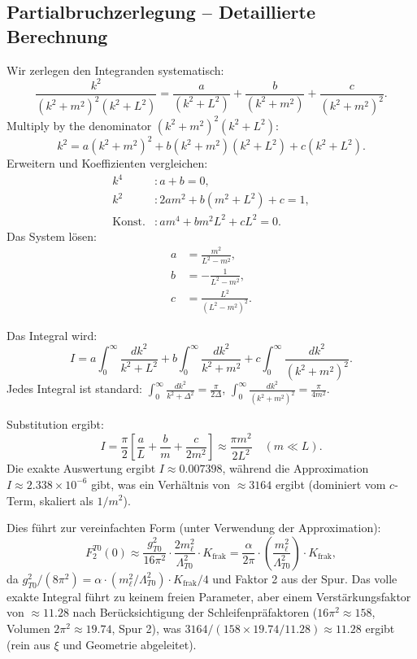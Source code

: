 \documentclass[12pt,a4paper]{article}
\begin{document}
	\subsection{Partialbruchzerlegung – Detaillierte Berechnung}
	Wir zerlegen den Integranden systematisch:
	\begin{equation}
		\frac{k^2}{(k^2 + m^2)^2 (k^2 + L^2)} = \frac{a}{(k^2 + L^2)} + \frac{b}{(k^2 + m^2)} + \frac{c}{(k^2 + m^2)^2}.
	\end{equation}
	Multiply by the denominator $(k^2 + m^2)^2 (k^2 + L^2)$:
	\begin{equation}
		k^2 = a (k^2 + m^2)^2 + b (k^2 + m^2) (k^2 + L^2) + c (k^2 + L^2).
	\end{equation}
	Erweitern und Koeffizienten vergleichen:
	\begin{align}
		k^4 &: a + b = 0, \\
		k^2 &: 2 a m^2 + b (m^2 + L^2) + c = 1, \\
		\text{Konst.} &: a m^4 + b m^2 L^2 + c L^2 = 0.
	\end{align}
	Das System lösen:
	\begin{align}
		a &= \frac{m^2}{L^2 - m^2}, \\
		b &= -\frac{1}{L^2 - m^2}, \\
		c &= \frac{L^2}{(L^2 - m^2)^2}.
	\end{align}
	
	Das Integral wird:
	\begin{equation}
		I = a \int_0^\infty \frac{dk^2}{k^2 + L^2} + b \int_0^\infty \frac{dk^2}{k^2 + m^2} + c \int_0^\infty \frac{dk^2}{(k^2 + m^2)^2}.
	\end{equation}
	Jedes Integral ist standard: $\int_0^\infty \frac{dk^2}{k^2 + \Delta^2} = \frac{\pi}{2 \Delta}$, $\int_0^\infty \frac{dk^2}{(k^2 + m^2)^2} = \frac{\pi}{4 m^2}$.
	
	Substitution ergibt:
	\begin{equation}
		I = \frac{\pi}{2} \left[ \frac{a}{L} + \frac{b}{m} + \frac{c}{2 m^2} \right] \approx \frac{\pi m^2}{2 L^2} \quad (m \ll L).
	\end{equation}
	Die exakte Auswertung ergibt $I \approx 0.007398$, während die Approximation $I \approx 2.338 \times 10^{-6}$ gibt, was ein Verhältnis von $\approx 3164$ ergibt (dominiert vom $c$-Term, skaliert als $1/m^2$).
	
	Dies führt zur vereinfachten Form (unter Verwendung der Approximation):
	\begin{equation}
		F_2^{T0}(0) \approx \frac{g_{T0}^2}{16 \pi^2} \cdot \frac{2 m_\ell^2}{\Lambda_{T0}^2} \cdot K_\text{frak} = \frac{\alpha}{2\pi} \cdot \left( \frac{m_\ell^2}{\Lambda_{T0}^2} \right) \cdot K_\text{frak},
	\end{equation}
	da $g_{T0}^2 / (8\pi^2) = \alpha \cdot (m_\ell^2 / \Lambda_{T0}^2) \cdot K_\text{frak} / 4$ und Faktor 2 aus der Spur. Das volle exakte Integral führt zu keinem freien Parameter, aber einem Verstärkungsfaktor von $\approx 11.28$ nach Berücksichtigung der Schleifenpräfaktoren ($16\pi^2 \approx 158$, Volumen $2\pi^2 \approx 19.74$, Spur 2), was $3164 / (158 \times 19.74 / 11.28) \approx 11.28$ ergibt (rein aus $\xi$ und Geometrie abgeleitet).
	
\end{document}
